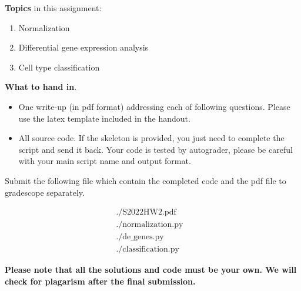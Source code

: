 \noindent 
{\bf Topics} in this assignment: 
\begin{enumerate}
\item Normalization
\item Differential gene expression analysis
\item Cell type classification
\end{enumerate}
\vspace{0.2in}


\noindent 
{\bf What to hand in}. 
\begin{itemize}
\item One write-up (in pdf format) addressing each of following questions. Please use the latex template included in the handout.
\item All source code. If the skeleton is provided, you just need to complete the script and send it back. Your code is tested by autograder, please be careful with your main script name and output format.
\end{itemize}

Submit the following file which contain the completed code and the
pdf file to gradescope separately. 

\[
  \begin{array}{lllll}
    ./\text{S2022HW2.pdf}&  \\
    ./\text{normalization.py}& \\
    ./\text{de\_genes.py}& \\
    ./\text{classification.py}&
  \end{array}
\]

\textbf{ Please note that all the solutions and code must be your own. We will check for plagarism after the final submission. } 
